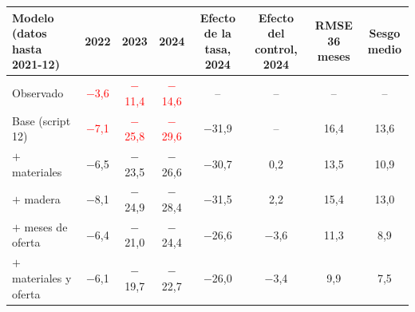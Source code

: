 \begin{tabular}{lccccccc}
\toprule
Modelo (datos hasta 2021-12) & 2022 & 2023 & 2024 & Efecto de la tasa, 2024 & Efecto del control, 2024 & RMSE 36 meses & Sesgo medio
\\ \midrule
Observado & \textcolor{red}{\ensuremath{-}3{,}6} & \textcolor{red}{\ensuremath{-}11{,}4} & \textcolor{red}{\ensuremath{-}14{,}6} & -- & -- & -- & -- \\
Base (script 12) & \textcolor{red}{\ensuremath{-}7{,}1} & \textcolor{red}{\ensuremath{-}25{,}8} & \textcolor{red}{\ensuremath{-}29{,}6} & \ensuremath{-}31{,}9 & -- & 16{,}4 & 13{,}6 \\
$+$ materiales & \ensuremath{-}6{,}5 & \ensuremath{-}23{,}5 & \ensuremath{-}26{,}6 & \ensuremath{-}30{,}7 & 0{,}2 & 13{,}5 & 10{,}9 \\
$+$ madera & \ensuremath{-}8{,}1 & \ensuremath{-}24{,}9 & \ensuremath{-}28{,}4 & \ensuremath{-}31{,}5 & 2{,}2 & 15{,}4 & 13{,}0 \\
$+$ meses de oferta & \ensuremath{-}6{,}4 & \ensuremath{-}21{,}0 & \ensuremath{-}24{,}4 & \ensuremath{-}26{,}6 & \ensuremath{-}3{,}6 & 11{,}3 & 8{,}9 \\
$+$ materiales y oferta & \ensuremath{-}6{,}1 & \ensuremath{-}19{,}7 & \ensuremath{-}22{,}7 & \ensuremath{-}26{,}0 & \ensuremath{-}3{,}4 & 9{,}9 & 7{,}5 \\
\bottomrule
\end{tabular}
